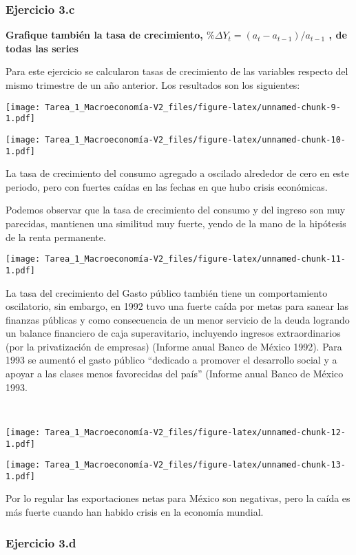 \documentclass[
]{article}
\begin{document}
\newpage

\hypertarget{ejercicio-3.c}{%
\subsubsection{Ejercicio 3.c}\label{ejercicio-3.c}}

\textbf{Grafique también la tasa de crecimiento,
\(\% \Delta Y_t =(a_t-a_{t-1})/a_{t-1}\) , de todas las series}

Para este ejercicio se calcularon tasas de crecimiento de las variables
respecto del mismo trimestre de un año anterior. Los resultados son los
siguientes:

\texttt{[image: Tarea\_1\_Macroeconomía-V2\_files/figure-latex/unnamed-chunk-9-1.pdf]}

\texttt{[image: Tarea\_1\_Macroeconomía-V2\_files/figure-latex/unnamed-chunk-10-1.pdf]}

La tasa de crecimiento del consumo agregado a oscilado alrededor de cero
en este periodo, pero con fuertes caídas en las fechas en que hubo
crisis económicas.

Podemos observar que la tasa de crecimiento del consumo y del ingreso
son muy parecidas, mantienen una similitud muy fuerte, yendo de la mano
de la hipótesis de la renta permanente.

\texttt{[image: Tarea\_1\_Macroeconomía-V2\_files/figure-latex/unnamed-chunk-11-1.pdf]}

La tasa del crecimiento del Gasto público también tiene un
comportamiento oscilatorio, sin embargo, en 1992 tuvo una fuerte caída
por metas para sanear las finanzas públicas y como consecuencia de un
menor servicio de la deuda logrando un balance financiero de caja
superavitario, incluyendo ingresos extraordinarios (por la privatización
de empresas) (Informe anual Banco de México 1992). Para 1993 se aumentó
el gasto público ``dedicado a promover el desarrollo social y a apoyar a
las clases menos favorecidas del país'' (Informe anual Banco de México
1993.

~

\texttt{[image: Tarea\_1\_Macroeconomía-V2\_files/figure-latex/unnamed-chunk-12-1.pdf]}

\texttt{[image: Tarea\_1\_Macroeconomía-V2\_files/figure-latex/unnamed-chunk-13-1.pdf]}

Por lo regular las exportaciones netas para México son negativas, pero
la caída es más fuerte cuando han habido crisis en la economía mundial.

\hypertarget{ejercicio-3.d}{%
\subsubsection{Ejercicio 3.d}\label{ejercicio-3.d}}
\end{document}
